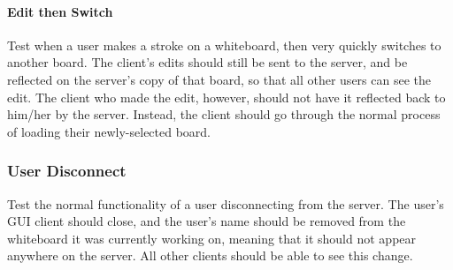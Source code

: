 \paragraph{Edit then Switch}
Test when a user makes a stroke on a whiteboard, then very quickly switches to another board. The client’s edits should still be sent to the server, and be reflected on the server’s copy of that board, so that all other users can see the edit. The client who made the edit, however, should not have it reflected back to him/her by the server. Instead, the client should go through the normal process of loading their newly-selected board.

\subsubsection{User Disconnect}
Test the normal functionality of a user disconnecting from the server. The user’s GUI client should close, and the user’s name should be removed from the whiteboard it was currently working on, meaning that it should not appear anywhere on the server. All other clients should be able to see this change.